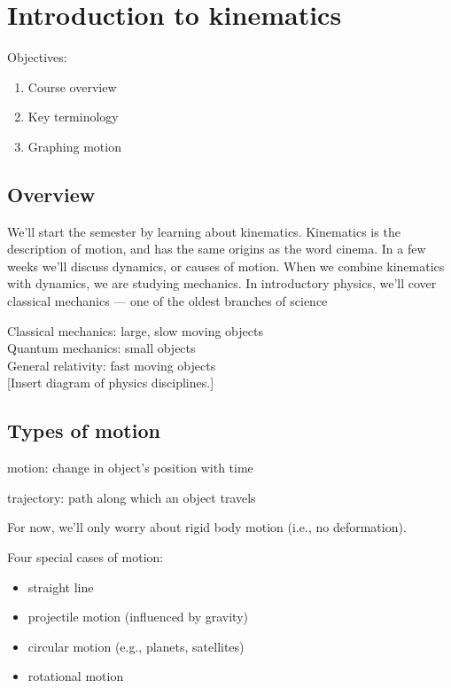 \section{Introduction to kinematics}
Objectives:
\begin{enumerate}
  \item Course overview
  \item Key terminology
    \item Graphing motion
\end{enumerate}

\subsection{Overview}
We'll start the semester by learning about kinematics. Kinematics is the description of motion, and has the same origins as the word cinema. In a few weeks we'll discuss dynamics, or causes of motion. When we combine kinematics with dynamics, we are studying mechanics. In introductory physics, we'll cover classical mechanics --- one of the oldest branches of science

Classical mechanics: large, slow moving objects\\
Quantum mechanics: small objects\\
General relativity: fast moving objects\\

[Insert diagram of physics disciplines.]
\vspace{5cm}

\subsection{Types of motion}
motion: change in object's position with time

trajectory: path along which an object travels

For now, we'll only worry about rigid body motion (i.e., no deformation).

Four special cases of motion:

\begin{itemize}
\item straight line
\item projectile motion (influenced by gravity)
\item circular motion (e.g., planets, satellites)
\item rotational motion
\end{itemize}

\vspace{6cm}

